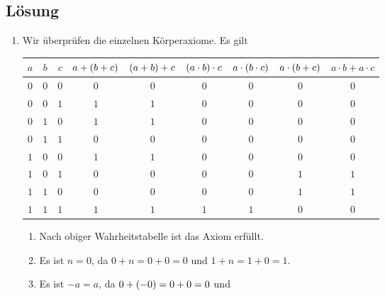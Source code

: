 \documentclass[german,12pt]{homework}
\DeclarePairedDelimiter{\enbrace}{(}{)}
\begin{document}
    \subsection*{Lösung}
    \begin{enumerate}
        \item Wir überprüfen die einzelnen Körperaxiome. Es gilt
        \begin{center}
            \begin{tabular}{ccccccccc}
                \toprule
                \(a\) & \(b\) & \(c\) & \(a + \enbrace*{b + c}\) &
                \(\enbrace*{a + b} + c\) & \(\enbrace*{a \cdot b} \cdot c\) &
                \(a \cdot \enbrace*{b \cdot c}\) & \(a \cdot \enbrace*{b + c}\)
                & \(a \cdot b + a \cdot c\)\\
                \midrule
                \(0\) & \(0\) & \(0\) & \(0\) & \(0\) & \(0\) & \(0\) & \(0\) &
                \(0\)\\
                \(0\) & \(0\) & \(1\) & \(1\) & \(1\) & \(0\) & \(0\) & \(0\) &
                \(0\)\\
                \(0\) & \(1\) & \(0\) & \(1\) & \(1\) & \(0\) & \(0\) & \(0\) &
                \(0\)\\
                \(0\) & \(1\) & \(1\) & \(0\) & \(0\) & \(0\) & \(0\) & \(0\) &
                \(0\)\\
                \(1\) & \(0\) & \(0\) & \(1\) & \(1\) & \(0\) & \(0\) & \(0\) &
                \(0\)\\
                \(1\) & \(0\) & \(1\) & \(0\) & \(0\) & \(0\) & \(0\) & \(1\) &
                \(1\)\\
                \(1\) & \(1\) & \(0\) & \(0\) & \(0\) & \(0\) & \(0\) & \(1\) &
                \(1\)\\
                \(1\) & \(1\) & \(1\) & \(1\) & \(1\) & \(1\) & \(1\) & \(0\) &
                \(0\)\\
                \bottomrule
            \end{tabular}
        \end{center}
        \begin{enumerate}[label=(A\arabic*)]
            \item Nach obiger Wahrheitstabelle ist das Axiom erfüllt.
            \item Es ist \(n = 0\), da \(0 + n = 0 + 0 = 0\) und \(1 + n = 1 +
            0 = 1\).
            \item Es ist \(-a = a\), da \(0 + \enbrace*{-0} = 0 + 0 = 0\) und

\end{enumerate}
\end{enumerate}
\end{document}
